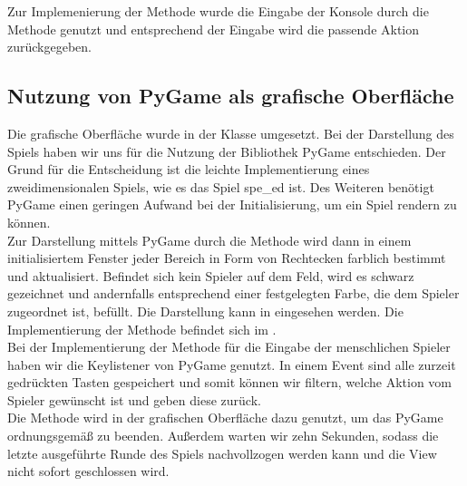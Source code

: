 Zur Implemenierung der Methode  wurde die Eingabe der Konsole durch die Methode 
genutzt und entsprechend der Eingabe wird die passende Aktion zurückgegeben.

\subsection{Nutzung von PyGame als grafische Oberfläche}
\label{subsec:oberflaeche-pygame}

Die grafische Oberfläche wurde in der Klasse  umgesetzt.
Bei der Darstellung des Spiels haben wir uns für die Nutzung der Bibliothek PyGame entschieden.
Der Grund für die Entscheidung ist die leichte Implementierung eines zweidimensionalen Spiels, wie es das Spiel
spe\_ed ist.
Des Weiteren benötigt PyGame einen geringen Aufwand bei der Initialisierung, um ein Spiel rendern zu können. \\

Zur Darstellung mittels PyGame durch die Methode  wird dann in einem initialisiertem Fenster
jeder Bereich in Form von Rechtecken farblich bestimmt und aktualisiert.
Befindet sich kein Spieler auf dem Feld, wird es schwarz gezeichnet und andernfalls entsprechend einer festgelegten
Farbe, die dem Spieler zugeordnet ist, befüllt.
Die Darstellung kann in  eingesehen werden.
Die Implementierung der Methode befindet sich im . \\

Bei der Implementierung der Methode  für die Eingabe der menschlichen Spieler haben wir die
Keylistener von PyGame genutzt.
In einem Event sind alle zurzeit gedrückten Tasten gespeichert und somit können wir filtern, welche Aktion vom Spieler
gewünscht ist und geben diese zurück. \\

Die Methode  wird in der grafischen Oberfläche dazu genutzt, um das PyGame ordnungsgemäß zu beenden.
Außerdem warten wir zehn Sekunden, sodass die letzte ausgeführte Runde des Spiels nachvollzogen werden kann und die
View nicht sofort geschlossen wird.

